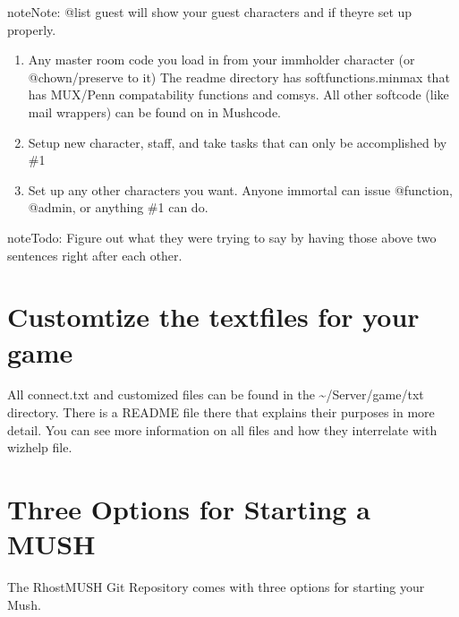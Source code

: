 \documentclass[letterpaper,10pt,english]{sphinxmanual}
\begin{document}
\begin{sphinxadmonition}{note}{Note:}
\sphinxAtStartPar
@list guest will show your guest characters and if they\textquotesingle{}re set up properly.
\end{sphinxadmonition}
\begin{enumerate}
%
\item {} 
\sphinxAtStartPar
Any master room code you load in from your immholder character (or @chown/preserve to it) The readme directory has softfunctions.minmax that has MUX/Penn compatability functions and comsys.  All other softcode (like mail wrappers) can be found on  in Mushcode.

\item {} 
\sphinxAtStartPar
Setup new character, staff, and take tasks that can only be accomplished by \#1

\item {} 
\sphinxAtStartPar
Set up any other characters you want.  Anyone immortal can issue @function, @admin, or anything \#1 can do.

\end{enumerate}

\begin{sphinxadmonition}{note}{\label{\detokenize{install:id8}}Todo:}
\sphinxAtStartPar
Figure out what they were trying to say by having those above two sentences right after each other.
\end{sphinxadmonition}


\section{Customtize the textfiles for your game}
\label{\detokenize{install:customtize-the-textfiles-for-your-game}}
\sphinxAtStartPar
All connect.txt and customized files can be found in the \textasciitilde{}/Server/game/txt directory.  There is a
README file there that explains their purposes in more detail.  You can see more information on
all files and how they inter\sphinxhyphen{}relate with \textquotesingle{}wizhelp file\textquotesingle{}.


\section{Three Options for Starting a MUSH}
\label{\detokenize{install:three-options-for-starting-a-mush}}
\sphinxAtStartPar
The RhostMUSH Git Repository comes with three options for starting your Mush.
\end{document}
